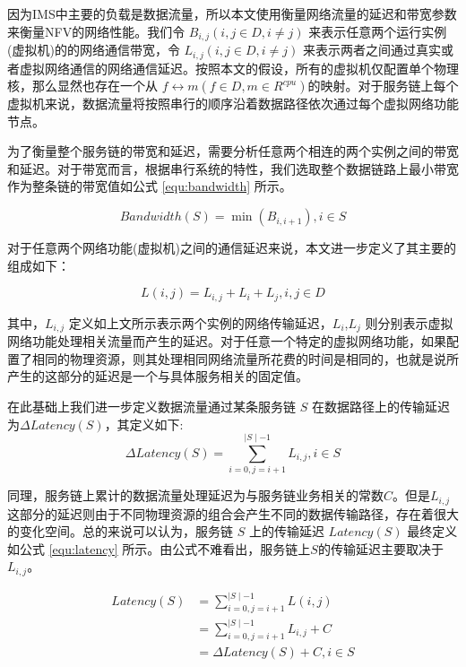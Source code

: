 因为IMS中主要的负载是数据流量，所以本文使用衡量网络流量的延迟和带宽参数来衡量NFV的网络性能。我们令 $B_{i,j} (i,j \in D, i \neq j)$ 来表示任意两个运行实例(虚拟机)的的网络通信带宽，令 $L_{i,j} (i,j \in D ,i \neq j)$ 来表示两者之间通过真实或者虚拟网络通信的网络通信延迟。按照本文的假设，所有的虚拟机仅配置单个物理核，那么显然也存在一个从 $f \longleftrightarrow m (f \in D, m \in R^{cpu})$的映射。对于服务链上每个虚拟机来说，数据流量将按照串行的顺序沿着数据路径依次通过每个虚拟网络功能节点。

为了衡量整个服务链的带宽和延迟，需要分析任意两个相连的两个实例之间的带宽和延迟。对于带宽而言，根据串行系统的特性，我们选取整个数据链路上最小带宽作为整条链的带宽值如公式 \ref{equ:bandwidth} 所示。 

\begin{equation}
\label{equ:bandwidth}
Bandwidth(S) = \min{(B_{i,i+1} )}, i \in S
\end{equation}

对于任意两个网络功能(虚拟机)之间的通信延迟来说，本文进一步定义了其主要的组成如下：

\begin{equation}
L(i,j) = L_{i,j} + L_{i} + L_{j}, i,j \in D
\end{equation}

其中，$L_{i,j}$ 定义如上文所示表示两个实例的网络传输延迟，$L_{i}$,$L_{j}$ 则分别表示虚拟网络功能处理相关流量而产生的延迟。对于任意一个特定的虚拟网络功能，如果配置了相同的物理资源，则其处理相同网络流量所花费的时间是相同的，也就是说所产生的这部分的延迟是一个与具体服务相关的固定值。

在此基础上我们进一步定义数据流量通过某条服务链 $S$ 在数据路径上的传输延迟为$\Delta Latency(S)$，其定义如下:
\begin{equation}
\Delta Latency(S) = \sum_{i=0,j=i+1}^{\mid S\mid-1}{L_{i,j}}, i\in S
\end{equation}

同理，服务链上累计的数据流量处理延迟为与服务链业务相关的常数$C$。但是$L_{i,j}$这部分的延迟则由于不同物理资源的组合会产生不同的数据传输路径，存在着很大的变化空间。总的来说可以认为，服务链 $S$ 上的传输延迟 $Latency(S)$ 最终定义如公式 \ref{equ:latency} 所示。由公式不难看出，服务链上$S$的传输延迟主要取决于 $L_{i,j}$。

\begin{equation}
\label{equ:latency}
\begin{aligned}
Latency(S) & = \sum_{i=0,j=i+1}^{\mid S\mid-1}{L(i,j)} \\
& = \sum_{i=0,j=i+1}^{\mid S\mid-1}{L_{i,j}}  + C \\
& = \Delta Latency(S) + C, i\in S  		  \\ 
\end{aligned}
\end{equation}

